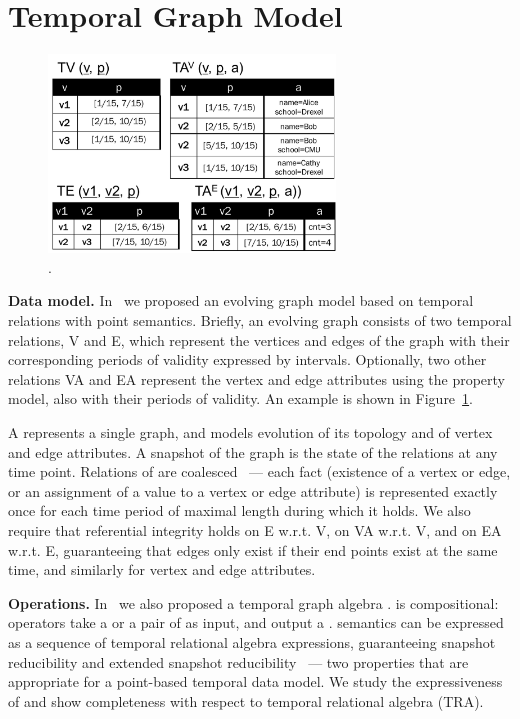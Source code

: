 \section{Temporal Graph Model}
\label{sec:tga}

\begin{figure}[t]
\centering
\includegraphics[width=3in]{figs/T1_rel.pdf}
\vspace{-0.2cm}
\caption{\tg {}.}
\vspace{-0.4cm}
\label{fig:tg_rel}
\end{figure}

{\bf Data model.}  In~\cite{PortalarXiv2016} we proposed an evolving
graph model \tg based on temporal relations with point semantics.
Briefly, an evolving graph consists of two temporal relations, V and
E, which represent the vertices and edges of the graph with their
corresponding periods of validity expressed by intervals.
Optionally, two other relations VA and EA represent the vertex and
edge attributes using the property model, also with their periods of
validity.  An example is shown in Figure~\ref{fig:tg_rel}.

A \tg represents a single graph, and models evolution of its topology
and of vertex and edge attributes.  A snapshot of the graph is the
state of the relations at any time point.  Relations of \tg are
coalesced~\cite{DBLP:conf/vldb/BohlenSS96} --- each fact (existence of
a vertex or edge, or an assignment of a value to a vertex or edge
attribute) is represented exactly once for each time period of maximal
length during which it holds.  We also require that referential
integrity holds on E w.r.t. V, on VA w.r.t. V, and on EA w.r.t. E,
guaranteeing that edges only exist if their end points exist at the
same time, and similarly for vertex and edge attributes.

{\bf Operations.} In~\cite{PortalarXiv2016} we also proposed a
temporal graph algebra \tga. \tga is
compositional: operators take a \tg or a pair of \tgs as input, and
output a \tg.  \tga semantics can be expressed as a sequence of
temporal relational algebra expressions, guaranteeing snapshot
reducibility and extended snapshot
reducibility~\cite{DBLP:reference/db/Bohlen092} --- two properties
that are appropriate for a point-based temporal data model.  We study
the expressiveness of \tga and show completeness with respect to
temporal relational algebra (TRA).

